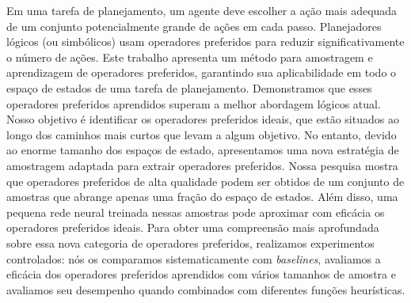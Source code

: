 \documentclass[ppgc,diss,english]{iiufrgs}
\begin{document}
\begin{translatedabstract}
Em uma tarefa de planejamento, um agente deve escolher a ação mais adequada de um conjunto potencialmente grande de ações em cada passo. Planejadores lógicos (ou simbólicos) usam operadores preferidos para reduzir significativamente o número de ações. Este trabalho apresenta um método para amostragem e aprendizagem de operadores preferidos, garantindo sua aplicabilidade em todo o espaço de estados de uma tarefa de planejamento. Demonstramos que esses operadores preferidos aprendidos superam a melhor abordagem lógicos atual.
Nosso objetivo é identificar os operadores preferidos ideais, que estão situados ao longo dos caminhos mais curtos que levam a algum objetivo. No entanto, devido ao enorme tamanho dos espaços de estado, apresentamos uma nova estratégia de amostragem adaptada para extrair operadores preferidos. Nossa pesquisa mostra que operadores preferidos de alta qualidade podem ser obtidos de um conjunto de amostras que abrange apenas uma fração do espaço de estados. Além disso, uma pequena rede neural treinada nessas amostras pode aproximar com eficácia os operadores preferidos ideais.
Para obter uma compreensão mais aprofundada sobre essa nova categoria de operadores preferidos, realizamos experimentos controlados: nós os comparamos sistematicamente com \textit{baselines}, avaliamos a eficácia dos operadores preferidos aprendidos com vários tamanhos de amostra e avaliamos seu desempenho quando combinados com diferentes funções heurísticas.
\end{translatedabstract}
\end{document}
